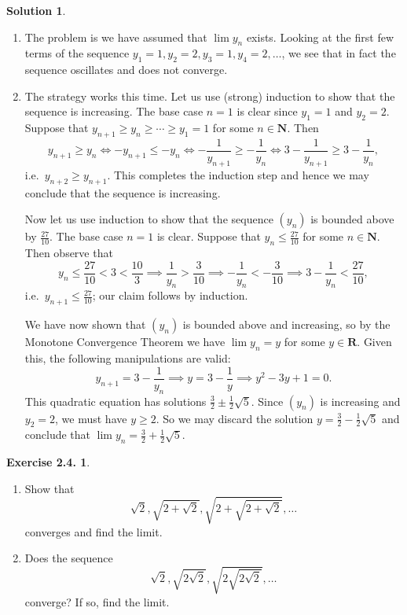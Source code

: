 \documentclass[12pt]{article}
\theoremstyle{definition}
\theoremstyle{exercise}
\newtheorem{exercise}{Exercise 2.4.}
\theoremstyle{solution}
\newtheorem*{solution}{Solution}
\newcommand{\N}{\mathbf{N}}
\newcommand{\R}{\mathbf{R}}
\begin{document}
\begin{solution}
    \begin{enumerate}
        \item The problem is we have assumed that \( \lim y_n \) exists. Looking at the first few terms of the sequence \( y_1 = 1, y_2 = 2, y_3 = 1, y_4 = 2, \ldots \), we see that in fact the sequence oscillates and does not converge.

        \item The strategy works this time. Let us use (strong) induction to show that the sequence is increasing. The base case \( n = 1 \) is clear since \( y_1 = 1 \) and \( y_2 = 2 \). Suppose that \( y_{n+1} \geq y_n \geq \cdots \geq y_1 = 1 \) for some \( n \in \N \). Then
        \[
            y_{n+1} \geq y_n \iff -y_{n+1} \leq -y_n \iff -\frac{1}{y_{n+1}} \geq -\frac{1}{y_n} \iff 3 - \frac{1}{y_{n+1}} \geq 3 - \frac{1}{y_n},
        \]
        i.e.\ \( y_{n+2} \geq y_{n+1} \). This completes the induction step and hence we may conclude that the sequence is increasing.

        Now let us use induction to show that the sequence \( (y_n) \) is bounded above by \( \tfrac{27}{10} \). The base case \( n = 1 \) is clear. Suppose that \( y_n \leq \tfrac{27}{10} \) for some \( n \in \N \). Then observe that
        \[
            y_n \leq \frac{27}{10} < 3 < \frac{10}{3} \implies \frac{1}{y_n} > \frac{3}{10} \implies - \frac{1}{y_n} < - \frac{3}{10} \implies 3 - \frac{1}{y_n} < \frac{27}{10},
        \]
        i.e.\ \( y_{n+1} \leq \tfrac{27}{10} \); our claim follows by induction.

        We have now shown that \( (y_n) \) is bounded above and increasing, so by the Monotone Convergence Theorem we have \( \lim y_n = y \) for some \( y \in \R \). Given this, the following manipulations are valid:
        \[
            y_{n+1} = 3 - \frac{1}{y_n} \implies y = 3 - \frac{1}{y} \implies y^2 - 3y + 1 = 0.
        \]
        This quadratic equation has solutions \( \tfrac{3}{2} \pm \tfrac{1}{2} \sqrt{5} \). Since \( (y_n) \) is increasing and \( y_2 = 2 \), we must have \( y \geq 2 \). So we may discard the solution \( y = \tfrac{3}{2} - \tfrac{1}{2} \sqrt{5} \) and conclude that \( \lim y_n = \tfrac{3}{2} + \tfrac{1}{2} \sqrt{5} \).
    \end{enumerate}
\end{solution}

\begin{exercise}
\label{ex:3}
    \begin{enumerate}
        \item Show that
        \[
            \sqrt{2}, \sqrt{2 + \sqrt{2}}, \sqrt{2 + \sqrt{2 + \sqrt{2}}}, \ldots
        \]
        converges and find the limit.

        \item Does the sequence
        \[
            \sqrt{2}, \sqrt{2 \sqrt{2}}, \sqrt{2 \sqrt{2 \sqrt{2}}}, \ldots
        \]
        converge? If so, find the limit.
    \end{enumerate}
\end{exercise}
\end{document}
